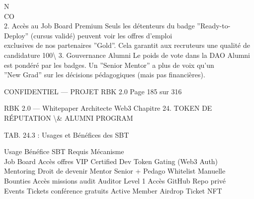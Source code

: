 \vspace{0.5em}
N\\
CO\\
2. Accès au Job Board Premium Seuls les détenteurs du badge ”Ready-to-Deploy” (cursus validé) peuvent voir les offres d’emploi\\
exclusives de nos partenaires ”Gold”. Cela garantit aux recruteurs une qualité de candidature 100\textbackslash{}%
\vspace{0.5em}
3. Gouvernance Alumni Le poids de vote dans la DAO Alumni est pondéré par les badges. Un ”Senior Mentor” a plus de voix qu’un\\
”New Grad” sur les décisions pédagogiques (mais pas financières).\\
\vspace{0.5em}
\vspace{0.5em}
\vspace{0.5em}
\vspace{0.5em}
\begin{confidential}CONFIDENTIEL — PROJET RBK 2.0                                Page 185 sur 316\end{confidential}
RBK 2.0 — Whitepaper Architecte Web3                                            Chapitre 24. TOKEN DE RÉPUTATION \textbackslash{}& ALUMNI PROGRAM\\
\vspace{0.5em}
\vspace{0.5em}
\begin{center}\begin{tabular}TAB. 24.3 : Usages et Bénéfices des SBT\end{tabular}\end{center}
\vspace{0.5em}
\vspace{0.5em}
Usage     Bénéfice                    SBT Requis      Mécanisme\\
Job Board Accès offres VIP            Certified Dev   Token Gating (Web3 Auth)\\
Mentoring Droit de devenir Mentor     Senior + Pedago Whitelist Manuelle\\
Bounties Accès missions audit         Auditor Level 1 Accès GitHub Repo privé\\
Events    Tickets conférence gratuits Active Member Airdrop Ticket NFT\\
\vspace{0.5em}
\vspace{0.5em}
\vspace{0.5em}
\vspace{0.5em}
